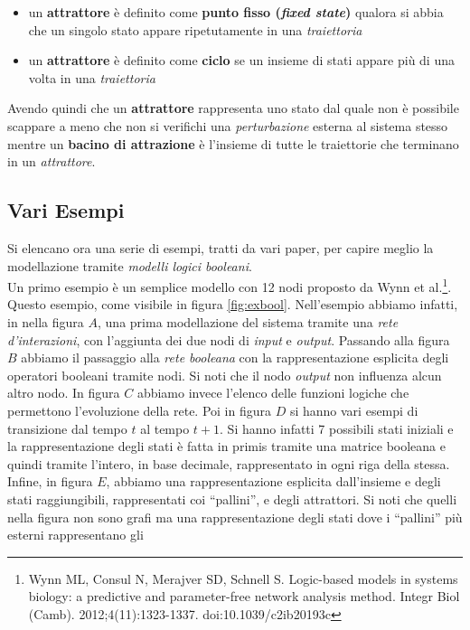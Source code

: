 \documentclass[a4paper,12pt, oneside]{book}
\begin{document}
\begin{itemize}
  \item un \textbf{attrattore} è definito come \textbf{punto fisso
    (\textit{fixed state})} qualora si abbia che un singolo stato appare
  ripetutamente in una \textit{traiettoria}
  \item un \textbf{attrattore} è definito come \textbf{ciclo} se un insieme di
  stati appare più di una volta in una \textit{traiettoria}
\end{itemize}
Avendo quindi che un \textbf{attrattore} rappresenta uno stato dal quale non è
possibile scappare a meno che non si verifichi una \textit{perturbazione}
esterna al sistema stesso mentre un \textbf{bacino di attrazione} è l'insieme di
tutte le traiettorie che terminano in un \textit{attrattore}.
\subsection{Vari Esempi}
Si elencano ora una serie di esempi, tratti da vari paper, per capire meglio la
modellazione tramite \textit{modelli logici booleani}.\\
Un primo esempio è un semplice modello con 12 nodi proposto da Wynn et
al.\footnote{Wynn ML, Consul N, Merajver SD, Schnell S. Logic-based models in
  systems biology: a predictive and parameter-free network analysis
  method. Integr Biol
  (Camb). 2012;4(11):1323-1337. doi:10.1039/c2ib20193c}. Questo esempio, come
visibile in figura \ref{fig:exbool}. Nell'esempio abbiamo infatti, in nella
figura $A$, una prima modellazione del sistema tramite una \textit{rete
  d'interazioni}, con l'aggiunta dei due nodi di \textit{input} e
\textit{output}. Passando alla figura $B$ abbiamo il passaggio alla 
\textit{rete booleana} con la rappresentazione esplicita degli operatori
booleani tramite nodi. Si noti che il nodo \textit{output} non influenza alcun
altro nodo. In figura $C$ abbiamo invece l'elenco delle funzioni logiche che
permettono l'evoluzione della rete. Poi in figura $D$ si hanno vari esempi di
transizione dal tempo $t$ al tempo $t+1$. Si hanno infatti 7 possibili stati
iniziali e la rappresentazione degli stati è fatta in primis tramite una matrice
booleana e quindi tramite l'intero, in base decimale, rappresentato in ogni riga
della stessa. Infine, in figura $E$, abbiamo una rappresentazione esplicita
dall'insieme e degli stati raggiungibili, rappresentati coi ``pallini'', e degli
attrattori. Si noti che quelli nella figura non sono grafi ma una 
rappresentazione degli stati dove i ``pallini'' più esterni rappresentano gli
\end{document}
